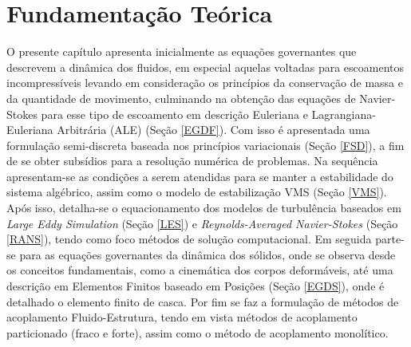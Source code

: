 \chapter{Fundamentação Teórica} \label{FT}

O presente capítulo apresenta inicialmente as equações governantes que descrevem a dinâmica dos fluidos, em especial aquelas voltadas para escoamentos incompressíveis levando em consideração os princípios da conservação de massa e da quantidade de movimento, culminando na obtenção das equações de Navier-Stokes para esse tipo de escoamento em descrição Euleriana e Lagrangiana-Euleriana Arbitrária (ALE) (Seção \ref{EGDF}). Com isso é apresentada uma formulação semi-discreta baseada nos princípios variacionais (Seção \ref{FSD}), a fim de se obter subsídios para a resolução numérica de problemas. Na sequência apresentam-se as condições a serem atendidas para se manter a estabilidade do sistema algébrico, assim como o modelo de estabilização VMS (Seção \ref{VMS}). Após isso, detalha-se o equacionamento dos modelos de turbulência baseados em \textit{Large Eddy Simulation} (Seção \ref{LES}) e \textit{Reynolds-Averaged Navier-Stokes} (Seção \ref{RANS}), tendo como foco métodos de solução computacional. Em seguida parte-se para as equações governantes da dinâmica dos sólidos, onde se observa desde os conceitos fundamentais, como a cinemática dos corpos deformáveis, até uma descrição em Elementos Finitos baseado em Posições (Seção \ref{EGDS}), onde é detalhado o elemento finito de casca. Por fim se faz a formulação de métodos de acoplamento Fluido-Estrutura, tendo em vista métodos de acoplamento particionado (fraco e forte), assim como o método de acoplamento monolítico.

%



%